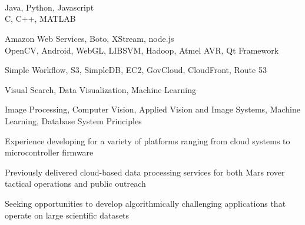 \documentclass{dvshkn-resume}
\begin{document}
\begin{resumebody}

\begin{sidebar}
    \sectionbody
    {
        \raggedleft
        \\
        \\
        \\
    }

    \sectionbody
    {
        \raggedleft
        Java, Python, Javascript\\
        C, C++, MATLAB\\
    }

    \sectionbody
    {
        \raggedleft
        Amazon Web Services, Boto, XStream, node.js\\
        OpenCV, Android, WebGL, LIBSVM, Hadoop, Atmel AVR, Qt Framework\\
    }

    \sectionbody
    {
        \raggedleft
        Simple Workflow, S3, SimpleDB, EC2, GovCloud, CloudFront, Route 53
    }

    \sectionbody
    {
        \raggedleft
        Visual Search, Data Visualization, Machine Learning
    }

    \sectionbody
    {
        \raggedleft
        Image Processing, Computer Vision, Applied Vision and Image Systems, Machine Learning, Database System Principles
    }
\end{sidebar}

\sectionbody
{
    \begin{compactitem}
        \item Experience developing for a variety of platforms ranging from cloud systems to microcontroller firmware
        \item Previously delivered cloud-based data processing services for both Mars rover tactical operations and public outreach
        \item Seeking opportunities to develop algorithmically challenging applications that operate on large scientific datasets
    \end{compactitem}
}


\end{resumebody}
\end{document}
